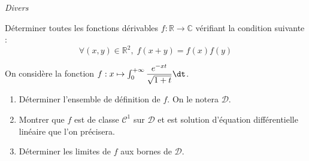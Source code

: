 \documentclass[a4paper,10pt]{report}
\begin{document}
\medskip

\begin{center}
\textit{{ {\large Divers}}}
\end{center}

\medskip








\begin{Exa} Déterminer toutes les fonctions dérivables $f : \mathbb{R} \rightarrow \mathbb{C}$ vérifiant la condition suivante :
$$ \forall (x,y) \in \mathbb{R}^2, \; f(x+y)=f(x)f(y)$$
\end{Exa}

%
%
%
%
%


\begin{Exa} On considère la fonction $f : x \mapsto \int_0^{+ \infty} \dfrac{e^{-xt}}{\sqrt{1+t}} \dt$.
\begin{enumerate}
\item Déterminer l'ensemble de définition de $f$. On le notera $\mathcal{D}$.
\item Montrer que $f$ est de classe $\mathcal{C}^1$ sur $\mathcal{D}$ et est solution d'équation différentielle linéaire que l'on précisera.
\item Déterminer les limites de $f$ aux bornes de $\mathcal{D}$.
\end{enumerate}
\end{Exa}
\end{document}
